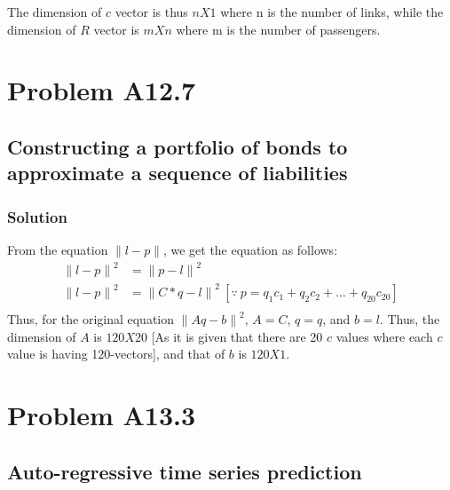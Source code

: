 \documentclass{article}
\newcommand{\norm}[1]{\left\lVert#1\right\rVert}
\begin{document}
    The dimension of $c$ vector is thus $nX1$ where n is the number of links, while the dimension of $R$ vector is $mXn$ where m is the number of passengers.

\section*{Problem A12.7}
\subsection*{Constructing a portfolio of bonds to approximate a sequence of liabilities}
\subsubsection*{Solution}
From the equation $\norm{l-p}$, we get the equation as follows:
\begin{align*}
    \norm{l-p}^2 & = \norm{p-l}^2\\
    \norm{l-p}^2 & = \norm{C*q-l}^2\ [\because\ p=q_1c_1+q_2c_2+\ldots+q_{20}c_{20}]\\
\end{align*}
Thus, for the original equation $\norm{Aq-b}^2$, $A=C$, $q=q$, and $b=l$. Thus, the dimension of $A$ is $120X20$ [As it is given that there are 20 $c$ values where each $c$ value is having 120-vectors], and that of $b$ is $120X1$.

\section*{Problem A13.3}
\subsection*{Auto-regressive time series prediction}
\end{document}
